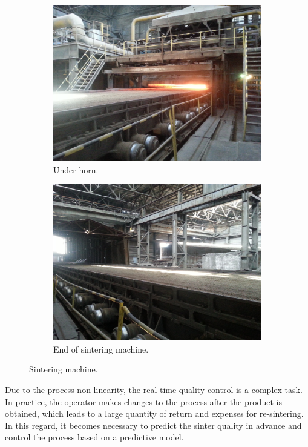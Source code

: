 \documentclass[AMS,STIX2COL]{WileyNJD-v2}
\begin{document}
\begin{figure}
	\centering
	\begin{subfigure}{.5\textwidth}
		\centering
		\includegraphics[width=.9\linewidth]{Sinter1.jpg}
		\caption{Under horn.}
		\label{fig:UnderHorn}
	\end{subfigure}%
	\begin{subfigure}{.5\textwidth}
		\centering
		\includegraphics[width=.9\linewidth]{Sinter2.jpg}
		\caption{End of sintering machine.}
		\label{fig:EndOfSinter}
	\end{subfigure}
	\caption{Sintering machine.}
	\label{fig:SinterMachine}
\end{figure}
Due to the process non-linearity, the real time quality control is a complex task. In practice, the operator makes changes to the process after the product is obtained, which leads to a large quantity of return and expenses for re-sintering. In this regard, it becomes necessary to predict the sinter quality in advance and control the process based on a predictive model.
\end{document}
